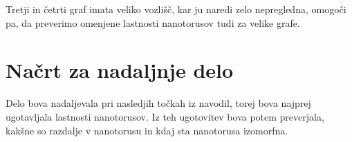 \documentclass[a4paper, 11 pt]{article}
\begin{document}
Tretji in četrti graf imata veliko vozlišč, kar ju naredi zelo nepregledna, omogoči pa, da preverimo omenjene lastnosti nanotorusov tudi za velike grafe.






\section{Načrt za nadaljnje delo}

Delo bova nadaljevala pri nasledjih točkah iz navodil, torej bova najprej ugotavljala lastnosti nanotorusov. Iz teh ugotovitev bova potem preverjala, kakšne so razdalje v nanotorusu in kdaj sta nanotorusa izomorfna.
\end{document}
